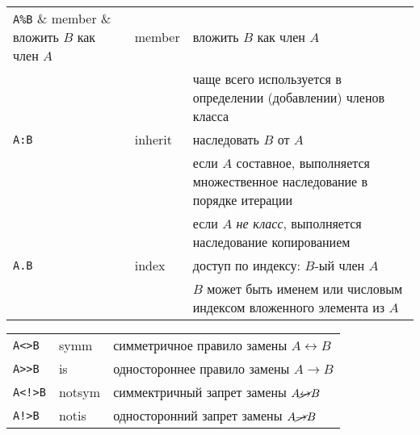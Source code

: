 \noindent\begin{tabular}{l l l}
\verb|A%B| & member & вложить $B$ как член $A$ \\
&&чаще всего используется в определении (добавлении) членов класса\\
\verb|A:B| & inherit & наследовать $B$ от $A$ \\
&&если $A$ составное, выполняется множественное наследование в порядке
итерации\\
&&если $A$ \emph{не класс}, выполняется наследование копированием\\
\verb|A.B| & index & доступ по индексу: $B$-ый член $A$\\
&&$B$ может быть именем или числовым индексом вложенного элемента из $A$\\
\hline
\end{tabular}

\noindent\begin{tabular}{l l l}
\verb|A<>B| & symm & симметричное правило замены $A\leftrightarrow B$\\
\verb|A>>B| & is & одностороннее правило замены $A\rightarrow B$\\
\verb|A<!>B| & notsym & симмектричный запрет замены $A\cancel\leftrightarrow
B$\\
\verb|A!>B| & notis & односторонний запрет замены $A\cancel\rightarrow B$\\
\end{tabular}

\secup

% 
% 
% 

